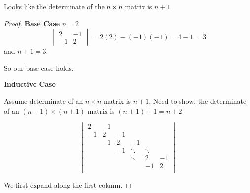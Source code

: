 \documentclass[12pt,letterpaper]{article}
\begin{document}
\begin{enumerate}
      Looks like the determinate of the $n \times n$ matrix is $n+1$

      \begin{proof}

        \textbf{Base Case} $n = 2$
        \[
          \begin{vmatrix}
            2 & -1 \\
            -1 & 2
          \end{vmatrix}
          = 2(2) - (-1)(-1) = 4 - 1 = 3
        \]
        and $n + 1 = 3$.

        So our base case holds.

        \textbf{Inductive Case}

        Assume determinate of an $n \times n$ matrix is $n + 1$.
        Need to show, the determinate of an $(n+1) \times (n+1)$ matrix is $(n+1) + 1 = n + 2$

        \[
          \begin{vmatrix}
            2  & -1 &        &        &        &        \\
            -1 & 2  & -1     &        &        &        \\
               & -1 & 2      & -1     &        &        \\
               &    & -1     & \ddots & \ddots &        \\
               &    &        & \ddots & 2      & -1     \\
               &    &        &        & -1     & 2      \\
          \end{vmatrix}
        \]

        We first expand along the first column.


\end{proof}
\end{enumerate}
\end{document}
